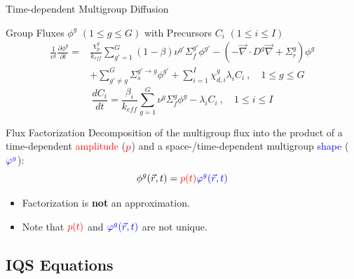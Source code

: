 \documentclass[8pt]{beamer}
\renewcommand{\div}{\vec{\nabla}\! \cdot \!}
\newcommand{\grad}{\vec{\nabla}}
\newcommand{\be}{\begin{equation*}}
\newcommand{\ee}{\end{equation*}}
\newcommand{\keff}{\ensuremath{k_{\textit{eff}}}}
\newcommand{\tcr}[1]{\textcolor{red}{#1}}
\newcommand{\tcb}[1]{\textcolor{blue}{#1}}
\begin{document}
\begin{frame}{Time-dependent Multigroup Diffusion}

\vspace{-3mm}

\begin{block}{Group Fluxes $\phi^g$ $(1 \le g \le G )$ with Precursors $C_i$ $(1 \le i \le I)$}
\begin{align*}
\frac{1}{v^g} \frac{\partial \phi^g }{\partial t} =& \frac{\chi_p^g}{\keff} \sum_{g'=1}^G (1-\beta) \nu^{g'} \Sigma_f^{g'} \phi^{g'} -  \left( -\div D^g \grad  + \Sigma_r^g \right) \phi^g  \nonumber \\
&  + \sum_{g'\neq g}^G\Sigma_s^{g'\to g} \phi^{g'}  + \sum_{i=1}^I\chi_{d,i}^g\lambda_i C_i \ , \quad 1 \le g \le G 
\end{align*}
\be
\frac{dC_i}{dt} = \frac{\beta_i}{k_{eff}}\sum_{g=1}^G\nu^{g} \Sigma_f^g \phi^{g} - \lambda_i C_i \ , \quad 1 \le i \le I 
\ee
\end{block}


\begin{block}{Flux Factorization}
Decomposition of the multigroup flux into the product of a time-dependent \tcr{amplitude} ($\tcr{p}$) and a space-/time-dependent multigroup \tcb{shape} ($\tcb{\varphi^g}$):
\begin{equation*}
\phi^g(\vec{r},t) = \tcr{p(t)} \tcb{\varphi^g(\vec{r},t)}
\end{equation*}

\begin{itemize}
\item 
Factorization is \textbf{not} an approximation.
\item
Note that $\tcr{p(t)}$ and $\tcb{\varphi^g(\vec{r},t)}$ are not unique. 
\end{itemize}
\end{block}

\end{frame}


\subsection{IQS Equations}
\end{document}
